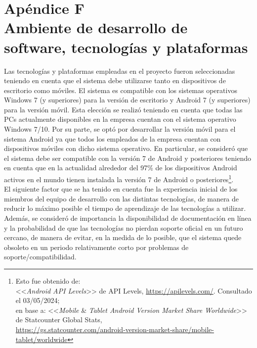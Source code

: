 \documentclass[a4paper, 12pt,twoside]{report}  %
\numberwithin{equation}{subsection} %
\begin{document}
\chapter*{\hypertarget{apendice_f}{}Apéndice F\\Ambiente de desarrollo de software, tecnologías y plataformas}

\indent Las tecnologías y plataformas empleadas en el proyecto fueron seleccionadas teniendo en cuenta que el sistema debe utilizarse tanto en dispositivos de escritorio como móviles. El sistema es compatible con los sistemas operativos Windows 7 (y superiores) para la versión de escritorio y Android 7 (y superiores) para la versión móvil. Esta elección se realizó teniendo en cuenta que todas las PCs actualmente disponibles en la empresa cuentan con el sistema operativo Windows 7/10. Por su parte, se optó por desarrollar la versión móvil para el sistema Android ya que todos los empleados de la empresa cuentan con dispositivos móviles con dicho sistema operativo. En particular, se consideró que el sistema debe ser compatible con la versión 7 de Android y posteriores teniendo en cuenta que en la actualidad alrededor del 97\% de los dispositivos Android activos en el mundo tienen instalada la versión 7 de Android o posteriores\setcounter{footnote}{0}\footnote{Esto fue obtenido de:\\
	<<\textit{Android API Levels}>> de API Levels, \url{https://apilevels.com/}. Consultado el 03/05/2024;\\
	en base a: <<\textit{Mobile} \& \textit{Tablet Android Version Market Share Worldwide}>> de Statcounter Global Stats,\\ \url{https://gs.statcounter.com/android-version-market-share/mobile-tablet/worldwide}}.\\
\indent El siguiente factor que se ha tenido en cuenta fue la experiencia inicial de los miembros del equipo de desarrollo con las distintas tecnologías, de manera de reducir lo máximo posible el tiempo de aprendizaje de las tecnologías a utilizar. Además, se consideró de importancia la disponibilidad de documentación en línea y la probabilidad de que las tecnologías no pierdan soporte oficial en un futuro cercano, de manera de evitar, en la medida de lo posible, que el sistema quede obsoleto en un periodo relativamente corto por problemas de soporte/compatibilidad.\\
\end{document}
